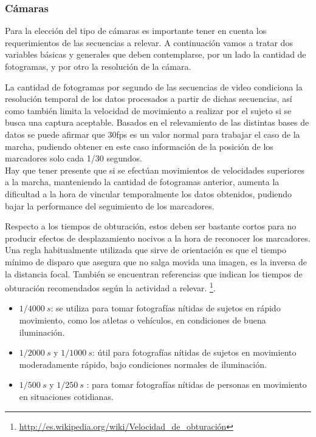 \subsubsection{Cámaras}\label{parrafo_Camaras} 
Para la elección del tipo de cámaras es importante tener en cuenta los requerimientos de las secuencias a relevar. A continuación vamos a tratar dos variables básicas y generales que deben contemplarse, por un lado la cantidad de fotogramas, y por otro la resolución de la cámara.

La cantidad de fotogramas por segundo de las secuencias de video condiciona la resolución temporal de los datos procesados a partir de dichas secuencias, así como también limita la velocidad de movimiento a realizar por el sujeto si se busca una captura aceptable.
Basados en el relevamiento de las distintas bases de datos se puede afirmar que 30fps es un valor normal para trabajar el caso de la marcha, pudiendo obtener en este caso información de la posición de los marcadores solo cada 1/30 segundos.\\ 
Hay que tener presente que si se efectúan movimientos de velocidades superiores a la marcha, manteniendo la cantidad de fotogramas anterior, aumenta la dificultad a la hora de vincular temporalmente los datos obtenidos, pudiendo bajar la performance del seguimiento de los marcadores. 

Respecto a los tiempos de obturación, estos deben ser bastante cortos  para no producir efectos de desplazamiento nocivos a la hora de reconocer los marcadores.
Una regla habitualmente utilizada que sirve de orientación es que el tiempo mínimo de disparo que asegura que no salga movida una imagen, es la inversa de la distancia focal. También se encuentran referencias que indican los tiempos de obturación recomendados según la actividad a relevar. \footnote{\textcolor{blue}{\underline{\url{http://es.wikipedia.org/wiki/Velocidad_de_obturación}}}}.
\begin{itemize}
\item $1 / 4000~ s$:  se utiliza para tomar fotografías nítidas de sujetos en rápido movimiento, como los atletas o vehículos, en condiciones de buena iluminación.
\item $1 / 2000 ~s$ y $1/ 1000~s$: útil  para fotografías nítidas de sujetos en movimiento moderadamente rápido, bajo condiciones normales de iluminación.
\item $1 / 500~s$ y $1/ 250~s$ :  para tomar fotografías nítidas de personas en movimiento en situaciones cotidianas.
\end{itemize}
 

